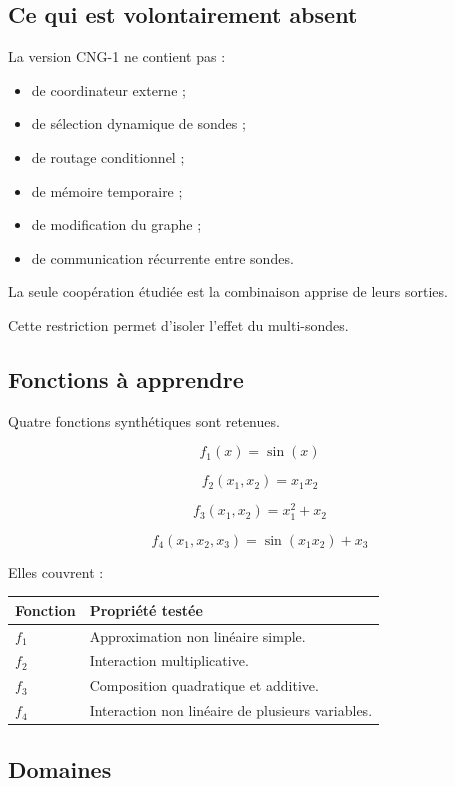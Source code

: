 \documentclass[11pt,a4paper]{article}
\begin{document}
\subsection{Ce qui est volontairement absent}

La version CNG-1 ne contient pas :
\begin{itemize}
    \item de coordinateur externe ;
    \item de sélection dynamique de sondes ;
    \item de routage conditionnel ;
    \item de mémoire temporaire ;
    \item de modification du graphe ;
    \item de communication récurrente entre sondes.
\end{itemize}

La seule coopération étudiée est la combinaison
apprise de leurs sorties.

Cette restriction permet d'isoler l'effet du
multi-sondes.

\subsection{Fonctions à apprendre}

Quatre fonctions synthétiques sont retenues.

\[
f_1(x)=\sin(x)
\]

\[
f_2(x_1,x_2)=x_1x_2
\]

\[
f_3(x_1,x_2)=x_1^2+x_2
\]

\[
f_4(x_1,x_2,x_3)
=
\sin(x_1x_2)+x_3
\]

Elles couvrent :

\begin{tabularx}{\textwidth}{
    >{\centering\arraybackslash}p{}
    X
}
\toprule
\textbf{Fonction} & \textbf{Propriété testée} \\
\midrule
$f_1$ & Approximation non linéaire simple. \\
$f_2$ & Interaction multiplicative. \\
$f_3$ & Composition quadratique et additive. \\
$f_4$ & Interaction non linéaire de plusieurs variables. \\
\bottomrule
\end{tabularx}

\subsection{Domaines}
\end{document}
